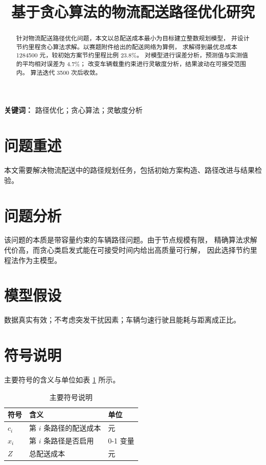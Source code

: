 \documentclass[12pt,a4paper]{ctexart}
\title{基于贪心算法的物流配送路径优化研究}
\author{}
\date{}
\begin{document}
\maketitle
\clearpage

\begin{abstract}
针对物流配送路径优化问题，本文以总配送成本最小为目标建立整数规划模型，
并设计节约里程贪心算法求解。以赛题附件给出的配送网络为算例，
求解得到最优总成本 1284500 元，较初始方案节约里程比例 23.8\%。
对模型进行误差分析，预测值与实测值的平均相对误差为 4.7\%；
改变车辆载重约束进行灵敏度分析，结果波动在可接受范围内。
算法迭代 3500 次后收敛。
\end{abstract}

\noindent\textbf{关键词：} 路径优化；贪心算法；灵敏度分析

\section{问题重述}
本文需要解决物流配送中的路径规划任务，包括初始方案构造、路径改进与结果检验。

\section{问题分析}
该问题的本质是带容量约束的车辆路径问题。由于节点规模有限，
精确算法求解代价高，而贪心类启发式能在可接受时间内给出高质量可行解，
因此选择节约里程法作为主模型。

\section{模型假设}
数据真实有效；不考虑突发干扰因素；车辆匀速行驶且能耗与距离成正比。

\section{符号说明}
主要符号的含义与单位如表 \ref{tab:notation} 所示。
\begin{table}[htbp]
\centering
\caption{主要符号说明}
\label{tab:notation}
\begin{tabular}{lll}
\toprule
符号 & 含义 & 单位 \\
\midrule
$c_i$ & 第 $i$ 条路径的配送成本 & 元 \\
$x_i$ & 第 $i$ 条路径是否启用 & 0-1 变量 \\
$Z$ & 总配送成本 & 元 \\
\bottomrule
\end{tabular}
\end{table}
\end{document}
